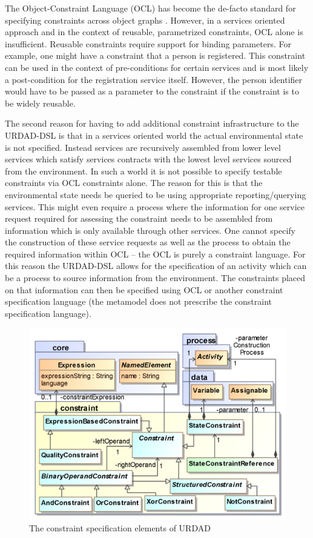 The Object-Constraint Language (OCL) has become the de-facto standard for specifying constraints across object graphs \cite{_object_2010}. However, in a services oriented approach and in the context of reusable, parametrized constraints, OCL alone is insufficient.
Reusable constraints require support for binding parameters. For example, one might have a constraint that a person is registered. This constraint can be used in the context of pre-conditions for certain services and is most likely a post-condition for the registration service itself. However, the person identifier would have to be passed as a parameter to the constraint if the constraint is to be widely reusable.

The second reason for having to add additional constraint infrastructure to the URDAD-DSL is that in a services oriented world the actual environmental state is not specified. Instead services are recursively assembled from lower level services which satisfy services contracts with the lowest level services sourced from the environment. In such a world it is not possible to specify testable constraints via OCL constraints alone. The reason for this is that the environmental state needs be queried to be using appropriate reporting/querying services. This might even require a process where the information for one service request required for assessing the constraint needs to be assembled from information which is only available through other services. One cannot specify the construction of these service requests as well as the process to obtain the required information within OCL -- the OCL is purely a constraint language. For this reason the URDAD-DSL allows for the specification of an activity which can be a process to source information from the environment. The constraints placed on that information can then be specified using OCL or another constraint specification language (the metamodel does not prescribe the constraint specification language).

\begin{figure}
  \centering
  \includegraphics{constraint}
  \caption{The constraint specification elements of URDAD}
  \label{fig:metamodel}
\end{figure}

